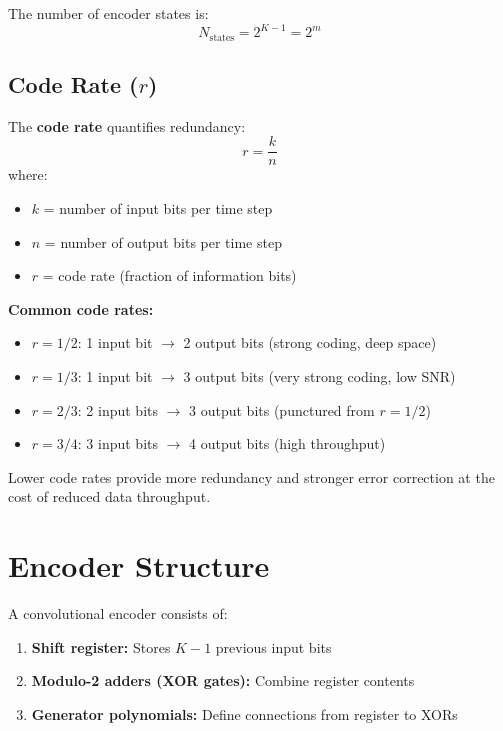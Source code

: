 The number of encoder states is:
\begin{equation}
N_{\text{states}} = 2^{K-1} = 2^m
\label{eq:num-states}
\end{equation}

\subsection{Code Rate ($r$)}

The \textbf{code rate} quantifies redundancy:
\begin{equation}
r = \frac{k}{n}
\label{eq:code-rate}
\end{equation}
where:
\begin{itemize}
\item $k$ = number of input bits per time step
\item $n$ = number of output bits per time step
\item $r$ = code rate (fraction of information bits)
\end{itemize}

\textbf{Common code rates:}
\begin{itemize}
\item $r = 1/2$: 1 input bit $\rightarrow$ 2 output bits (strong coding, deep space)
\item $r = 1/3$: 1 input bit $\rightarrow$ 3 output bits (very strong coding, low SNR)
\item $r = 2/3$: 2 input bits $\rightarrow$ 3 output bits (punctured from $r = 1/2$)
\item $r = 3/4$: 3 input bits $\rightarrow$ 4 output bits (high throughput)
\end{itemize}

Lower code rates provide more redundancy and stronger error correction at the cost of reduced data throughput.

\section{Encoder Structure}

A convolutional encoder consists of:
\begin{enumerate}
\item \textbf{Shift register:} Stores $K-1$ previous input bits
\item \textbf{Modulo-2 adders (XOR gates):} Combine register contents
\item \textbf{Generator polynomials:} Define connections from register to XORs
\end{enumerate}

